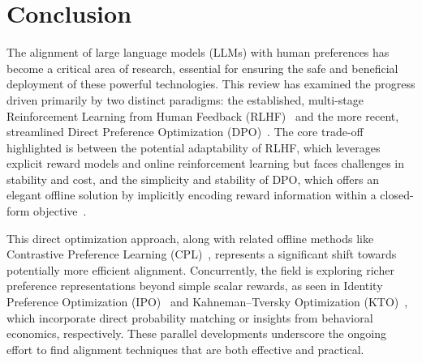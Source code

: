 \documentclass[a4paper,oneside,10pt,ngerman,english]{scrartcl}
\begin{document}
\section{Conclusion}
\label{sec:conclusion}

The alignment of large language models (LLMs) with human preferences has become a critical area of research, essential for ensuring the safe and beneficial deployment of these powerful technologies. This review has examined the progress driven primarily by two distinct paradigms: the established, multi-stage Reinforcement Learning from Human Feedback (RLHF)~\cite{bib:Christiano2017} and the more recent, streamlined Direct Preference Optimization (DPO)~\cite{bib:Rafailov2023}. The core trade-off highlighted is between the potential adaptability of RLHF, which leverages explicit reward models and online reinforcement learning but faces challenges in stability and cost, and the simplicity and stability of DPO, which offers an elegant offline solution by implicitly encoding reward information within a closed-form objective~\cite{bib:Rafailov2023}.

This direct optimization approach, along with related offline methods like Contrastive Preference Learning (CPL)~\cite{bib:Zhao2023}, represents a significant shift towards potentially more efficient alignment. Concurrently, the field is exploring richer preference representations beyond simple scalar rewards, as seen in Identity Preference Optimization (IPO)~\cite{bib:azar2023ipo} and Kahneman--Tversky Optimization (KTO)~\cite{bib:ethayarajh2024kto}, which incorporate direct probability matching or insights from behavioral economics, respectively. These parallel developments underscore the ongoing effort to find alignment techniques that are both effective and practical.
\end{document}
